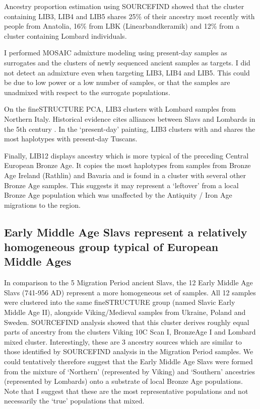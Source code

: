 Ancestry proportion estimation using SOURCEFIND showed that the cluster containing LIB3, LIB4 and LIB5 shares 25\% of their ancestry most recently with people from Anatolia, 16\% from LBK (Linearbandkeramik) and 12\% from a cluster containing Lombard individuals. 

I performed MOSAIC admixture modeling using present-day samples as surrogates and the clusters of newly sequenced ancient samples as targets. I did not detect an admixture even when targeting LIB3, LIB4 and LIB5. This could be due to low power or a low number of samples, or that the samples are unadmixed with respect to the surrogate populations.

On the fineSTRUCTURE PCA, LIB3 clusters with Lombard samples from Northern Italy. Historical evidence cites alliances between Slavs and Lombards in the 5th century \cite{lotter2003volkerverschiebungen}. In the `present-day' painting, LIB3 clusters with and shares the most haplotypes with present-day Tuscans.  

Finally, LIB12 displays ancestry which is more typical of the preceding Central European Bronze Age. It copies the most haplotypes from samples from Bronze Age Ireland (Rathlin) and Bavaria and is found in a cluster with several other Bronze Age samples. This suggests it may represent a `leftover' from a local Bronze Age population which was unaffected by the Antiquity / Iron Age migrations to the region.

\subsection{Early Middle Age Slavs represent a relatively homogeneous group typical of European Middle Ages}

In comparison to the 5 Migration Period ancient Slavs, the 12 Early Middle Age Slavs (741-956 AD) represent a more homogeneous set of samples. All 12 samples were clustered into the same fineSTRUCTURE group (named Slavic Early Middle Age II), alongside Viking/Medieval samples from Ukraine, Poland and Sweden. SOURCEFIND analysis showed that this cluster derives roughly equal parts of ancestry from the clusters  Viking 10C Scan I, BronzeAge I and Lombard mixed cluster. Interestingly, these are 3 ancestry sources which are similar to those identified by SOURCEFIND analysis in the Migration Period samples. We could tentatively therefore suggest that the Early Middle Age Slavs were formed from the mixture of `Northern' (represented by Viking) and `Southern' ancestries (represented by Lombards) onto a substrate of local Bronze Age populations. Note that I suggest that these are the most representative populations and not necessarily the `true' populations that mixed.

